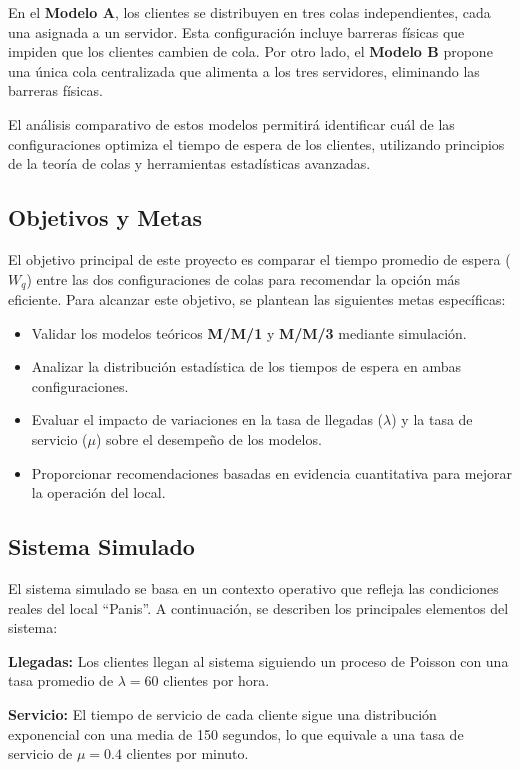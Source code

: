 \documentclass[a4paper,12pt]{article}
\begin{document}
En el \textbf{Modelo A}, los clientes se distribuyen en tres colas independientes, cada una asignada a un servidor. Esta configuración incluye barreras físicas que impiden que los clientes cambien de cola. Por otro lado, el \textbf{Modelo B} propone una única cola centralizada que alimenta a los tres servidores, eliminando las barreras físicas.

El análisis comparativo de estos modelos permitirá identificar cuál de las configuraciones optimiza el tiempo de espera de los clientes, utilizando principios de la teoría de colas y herramientas estadísticas avanzadas.

\subsection{Objetivos y Metas}

El objetivo principal de este proyecto es comparar el tiempo promedio de espera ($W_q$) entre las dos configuraciones de colas para recomendar la opción más eficiente. Para alcanzar este objetivo, se plantean las siguientes metas específicas:

\begin{itemize}
    \item Validar los modelos teóricos \textbf{M/M/1} y \textbf{M/M/3} mediante simulación.
    \item Analizar la distribución estadística de los tiempos de espera en ambas configuraciones.
    \item Evaluar el impacto de variaciones en la tasa de llegadas ($\lambda$) y la tasa de servicio ($\mu$) sobre el desempeño de los modelos.
    \item Proporcionar recomendaciones basadas en evidencia cuantitativa para mejorar la operación del local.
\end{itemize}

\subsection{Sistema Simulado}

El sistema simulado se basa en un contexto operativo que refleja las condiciones reales del local “Panis”. A continuación, se describen los principales elementos del sistema:

\textbf{Llegadas:} Los clientes llegan al sistema siguiendo un proceso de Poisson con una tasa promedio de $\lambda = 60$ clientes por hora.

\textbf{Servicio:} El tiempo de servicio de cada cliente sigue una distribución exponencial con una media de 150 segundos, lo que equivale a una tasa de servicio de $\mu = 0.4$ clientes por minuto.
\end{document}
